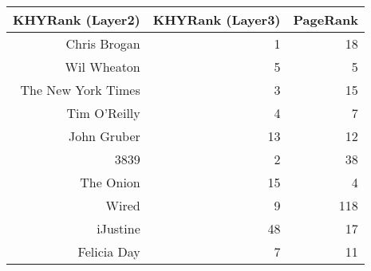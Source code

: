 %
%
%
%
%
%
%
%
%
%
%
\-\\
\begin{tabular}{|r|r|r|}
\hline
KHYRank (Layer2) & KHYRank (Layer3) & PageRank\\
\hline
Chris Brogan & 1 & 18 \\
Wil Wheaton & 5 & 5 \\
The New York Times & 3 & 15 \\
Tim O'Reilly & 4 & 7 \\
John Gruber & 13 & 12 \\
3839 & 2 & 38 \\
The Onion & 15 & 4 \\
Wired & 9 & 118 \\
iJustine & 48 & 17 \\
Felicia Day & 7 & 11 \\
\hline
\end{tabular}
